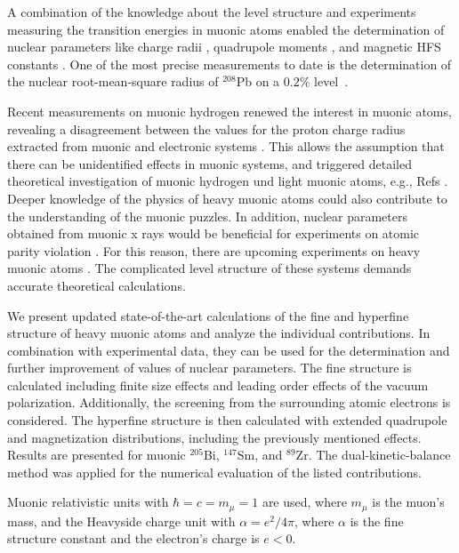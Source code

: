 A combination of the knowledge about the level structure and experiments measuring the transition energies in muonic atoms enabled the determination of nuclear parameters like charge radii \cite{Piller1990,Schaller1980}, quadrupole moments \cite{Dey1979}, and magnetic HFS constants \cite{Ruetschi1984}. One of the most precise measurements to date is the determination of the nuclear root-mean-square radius of $^{208}$Pb on a $0.2\%$ level~\cite{Bergem1988}.

Recent measurements on muonic hydrogen renewed the interest in muonic atoms, revealing a disagreement between the values for the proton charge radius extracted from muonic and electronic systems \cite{Pohl2010}. This allows the assumption that there can be unidentified effects in muonic systems, and triggered detailed theoretical investigation of muonic hydrogen und light muonic atoms, e.g., Refs \cite{indelicato2013,pachucki2015}. Deeper knowledge of the physics of heavy muonic atoms could also contribute to the understanding of the muonic puzzles. In addition, nuclear parameters obtained from muonic x rays would be beneficial for experiments on atomic parity violation \cite{Wansbeek2008}. For this reason, there are upcoming experiments on heavy muonic atoms \cite{kirch2016}. The complicated level structure of these systems demands accurate theoretical calculations.

We present updated state-of-the-art calculations of the fine and hyperfine structure of heavy muonic atoms and analyze the individual contributions. In combination with experimental data, they can be used for the determination and further improvement of values of nuclear parameters. The fine structure is calculated including finite size effects and leading order effects of the vacuum polarization. Additionally, the screening from the surrounding atomic electrons is considered. The hyperfine structure is then calculated with extended quadrupole and magnetization distributions, including the previously mentioned effects. Results are presented for muonic $^{205}$Bi, $^{147}$Sm, and $^{89}$Zr. The dual-kinetic-balance method \cite{Shabaev2004} was applied for the numerical evaluation of the listed contributions.

Muonic relativistic units with ${\hbar}{=}{c}{=}{m_\mu}{=}{1}$ are used, where $m_\mu$ is the muon's mass, and the Heavyside charge unit with $\alpha=e^2/4\pi$, where $\alpha$ is the fine structure constant and the electron's charge is ${e}{<}{0}$.
%
%
